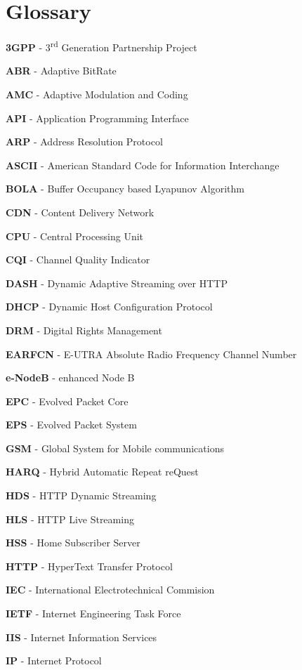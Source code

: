\cleardoublepage
{}
\chapter*{Glossary}


\textbf{3GPP} - 3\textsuperscript{rd} Generation Partnership Project

\textbf{ABR} - Adaptive BitRate

\textbf{AMC} - Adaptive Modulation and Coding

\textbf{API} - Application Programming Interface

\textbf{ARP} - Address Resolution Protocol

\textbf{ASCII} - American Standard Code for Information Interchange

\textbf{BOLA} - Buffer Occupancy based Lyapunov Algorithm

\textbf{CDN} - Content Delivery Network

\textbf{CPU} - Central Processing Unit

\textbf{CQI} - Channel Quality Indicator

\textbf{DASH} - Dynamic Adaptive Streaming over HTTP

\textbf{DHCP} - Dynamic Host Configuration Protocol

\textbf{DRM} - Digital Rights Management

\textbf{EARFCN} - E-UTRA Absolute Radio Frequency Channel Number

\textbf{e-NodeB} - enhanced Node B

\textbf{EPC} - Evolved Packet Core

\textbf{EPS} - Evolved Packet System

\textbf{GSM} - Global System for Mobile communications

\textbf{HARQ} - Hybrid Automatic Repeat reQuest

\textbf{HDS} - HTTP Dynamic Streaming

\textbf{HLS} - HTTP Live Streaming

\textbf{HSS} - Home Subscriber Server

\textbf{HTTP} - HyperText Transfer Protocol

\textbf{IEC} - International Electrotechnical Commision

\textbf{IETF} - Internet Engineering Task Force

\textbf{IIS} - Internet Information Services

\textbf{IP} - Internet Protocol

